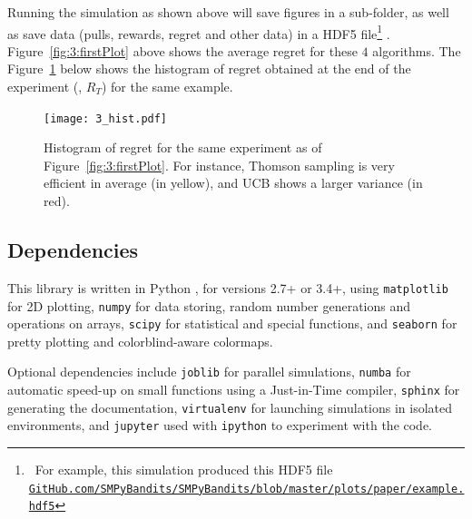 Running the simulation as shown above will save figures in a sub-folder, as well as save data (pulls, rewards, regret and other data) in a HDF5 file\footnote{~For example, this simulation produced this HDF5 file\\\texttt{\href{https://github.com/SMPyBandits/SMPyBandits/blob/master/plots/paper/example.hdf5}{GitHub.com/SMPyBandits/SMPyBandits/blob/master/plots/paper/example.hdf5}}}
\cite{h5py}.
Figure~\ref{fig:3:firstPlot} above shows the average regret for these $4$ algorithms.
The Figure~\ref{fig:3:firstPlot_hist} below shows the histogram of regret obtained at the end of the experiment (\ie, $R_T$) for the same example.

\begin{figure}[h!]  %
	\centering
	\texttt{[image: 3\_hist.pdf]}
	\caption{Histogram of regret for the same experiment as of Figure~\ref{fig:3:firstPlot}. For instance, Thomson sampling is very efficient in average (in yellow), and UCB shows a larger variance (in red).}
	\label{fig:3:firstPlot_hist}
\end{figure}


\subsection{Dependencies}
\label{sub:3:dependencies}

This library is written in Python \cite{python}, for versions 2.7+ or 3.4+, using \texttt{matplotlib} \cite{matplotlib} for 2D plotting, \texttt{numpy} \cite{numpy} for data storing, random number generations and operations on arrays, \texttt{scipy} \cite{scipy} for statistical and special functions, and \texttt{seaborn} \cite{seaborn} for pretty plotting and colorblind-aware colormaps.

Optional dependencies include \texttt{joblib} \cite{joblib} for parallel simulations, \texttt{numba} \cite{numba} for automatic speed-up on small functions using a Just-in-Time compiler, \texttt{sphinx} \cite{sphinx} for generating the documentation, \texttt{virtualenv} \cite{virtualenv} for launching simulations in isolated environments, and \texttt{jupyter} \cite{jupyter} used with \texttt{ipython} \cite{ipython} to experiment with the code.

